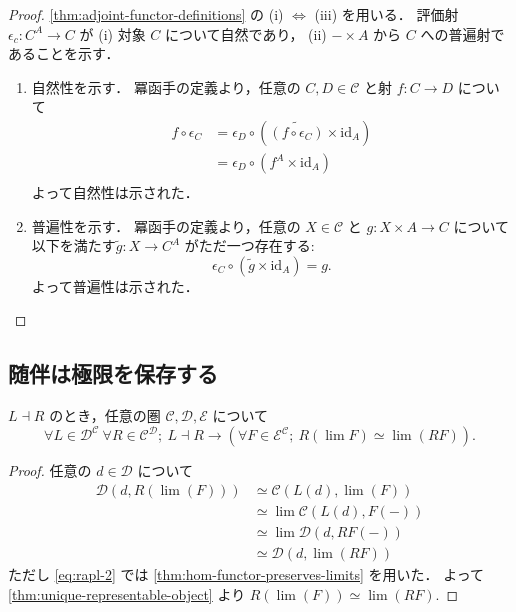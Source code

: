 \documentclass[titlepage]{ltjsreport}
\newcommand{\cat}[1]{\mathscr{#1}}
\newcommand{\objs}[1]{#1}
\newcommand{\mrps}[3]{#1(#2,#3)}
\newcommand{\id}[1]{\mathrm{id}_{#1}}
\newcommand{\Fun}[2]{{#2}^{#1}}
\begin{document}
\begin{proof}
  \cref{thm:adjoint-functor-definitions} の (i) $\Leftrightarrow$ (iii) を用いる．
  評価射 $\epsilon_c:{C}^A\to C$ が
  (i) 対象 $C$ について自然であり，
  (ii) $-\times A$ から $C$ への普遍射であることを示す．

  \begin{enumerate}[label=(\roman*)] %
    \item 自然性を示す．
          冪函手の定義より，任意の $C,D\in\objs{\cat{C}}$ と射 $f:C\to D$ について
          \begin{align*}
            f\circ\epsilon_C
             & =\epsilon_D\circ(\widetilde{(f\circ\epsilon_C)}\times\id{A}) \\
             & =\epsilon_D\circ(f^A\times\id{A})                            \\
          \end{align*}
          よって自然性は示された．
    \item 普遍性を示す．
          冪函手の定義より，任意の $X\in\objs{\cat{C}}$ と $g:X\times A\to C$
          について以下を満たす$\tilde{g}:X\to C^A$ がただ一つ存在する:
          \begin{equation*}
            \epsilon_C\circ(\tilde{g}\times\id{A})=g.
          \end{equation*}
          よって普遍性は示された．
  \end{enumerate}
\end{proof}

\subsection{随伴は極限を保存する}

{
  \def\C{\cat{C}}%
  \def\D{\cat{D}}%
  \def\E{\cat{E}}%
  \def\L{L}%
  \def\R{R}%
  \def\F{F}%
  \def\d{d}%
  \begin{theorem}[右随伴は極限を保存する]
    $\L\dashv\R$ のとき，任意の圏 $\C,\D,\E$ について
    \begin{equation}
      \forall\L\in\objs{\Fun{\C}{\D}}\ \forall\R\in\objs{\Fun{\D}{\C}};
      \ \L\dashv\R\rightarrow\left(
      \forall\F\in\objs{\Fun{\C}{\E}};\ \R(\lim{\F})\simeq\lim(\R\F)
      \right).
    \end{equation}
  \end{theorem}
  \begin{proof}
    任意の $\d\in\objs{\D}$ について
    \begin{align}
      \mrps{\D}{\d}{\R(\lim(F))}
       & \simeq\mrps{\C}{\L(\d)}{\lim(F)}                   \\
       & \simeq\lim\mrps{\C}{\L(\d)}{F(-)}\label{eq:rapl-2} \\
       & \simeq\lim\mrps{\D}{\d}{RF(-)}                     \\
       & \simeq\mrps{\D}{\d}{\lim(RF)}
    \end{align}
    ただし \cref{eq:rapl-2} では \cref{thm:hom-functor-preserves-limits}
    を用いた．
    よって \cref{thm:unique-representable-object} より $\R(\lim(F))\simeq\lim(RF)$.
  \end{proof}
}
\end{document}
